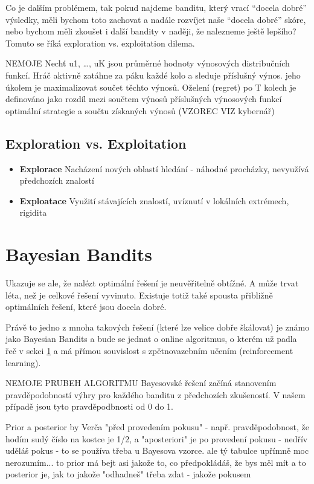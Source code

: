 \documentclass[thesis=M,czech]{FITthesis}[2014/05/07]
\begin{document}
Co je dalším problémem, tak pokud najdeme banditu, který vrací “docela dobré” výsledky, měli bychom toto zachovat a nadále rozvíjet naše “docela dobré” skóre, nebo bychom měli zkoušet i další bandity v naději, že nalezneme ještě lepšího? Tomuto se říká exploration vs. exploitation dilema.

NEMOJE
Nechť u1, …, uK jsou průměrné hodnoty výnosových distribučních funkcí. Hráč aktivně zatáhne za páku každé kolo a sleduje příslušný výnos. jeho úkolem je maximalizovat součet těchto výnosů. Oželení (regret) po T kolech je definováno jako rozdíl mezi součtem výnosů příslušných výnosových funkcí optimální strategie a součtu získaných výnosů (VZOREC VIZ kybernář)

\subsection{Exploration vs. Exploitation}

\begin{itemize}
  \item \textbf{Explorace} Nacházení nových oblastí hledání - náhodné procházky, nevyužívá předchozích znalostí
  \item \textbf{Exploatace} Využití stávajících znalostí, uvíznutí v lokálních extrémech, rigidita
\end{itemize}	

\section{Bayesian Bandits}

Ukazuje se ale, že nalézt optimální řešení je neuvěřitelně obtížné. A může trvat léta, než je celkové řešení vyvinuto. Existuje totiž také spousta přibližně optimálních řešení, které jsou docela dobré. 

Právě to jedno z mnoha takových řešení (které lze velice dobře škálovat) je známo jako Bayesian Bandits a bude se jednat o online algoritmus, o kterém už padla řeč v sekci \ref{} a má přímou souvislost s zpětnovazebním učením (reinforcement learning).

NEMOJE PRUBEH ALGORITMU
Bayesovské řešení začíná stanovením pravděpodobností výhry pro každého banditu z předchozích zkušeností. V našem případě jsou tyto pravděpodbnosti od 0 do 1. 

Prior a posterior by Verča
"před provedením pokusu" - např. pravděpodobnost, že hodím sudý číslo na kostce je 1/2, a "aposteriori" je po provedení pokusu - nedřív uděláš pokus - to se používa třeba u Bayesova vzorce. ale tý tabulce upřímně moc nerozumím... to prior má bejt asi jakože to, co předpokládáš, že bys měl mít a to posterior je, jak to jakože "odhadneš" třeba  zdat - jakože pokusem
\end{document}
